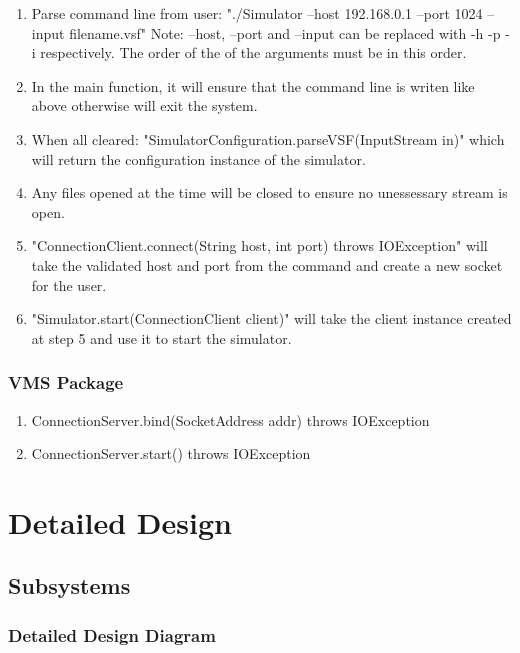 \documentclass{article}
\begin{document}
\begin{enumerate}
  \item Parse command line from user: 
		\newline "./Simulator --host 192.168.0.1 --port 1024 --input filename.vsf"
		\newline Note: --host, --port and --input can be replaced with -h -p -i respectively.
		\newline The order of the of the arguments must be in this order.
  \item In the main function, it will ensure that the command line is writen like above otherwise will exit the system.
  \item When all cleared: "SimulatorConfiguration.parseVSF(InputStream in)"
		\newline which will return the configuration instance of the simulator.
  \item Any files opened at the time will be closed to ensure no unessessary stream is open.
	\item "ConnectionClient.connect(String host, int port) throws IOException" will take the validated host and port from the command and create a new socket for the user.
	\item "Simulator.start(ConnectionClient client)" will take the client instance created at step 5 and use it to start the simulator.	
\end{enumerate}

\subsubsection{VMS Package}

\begin{enumerate}
  \item ConnectionServer.bind(SocketAddress addr) throws IOException
	\item ConnectionServer.start() throws IOException
\end{enumerate}


\section{Detailed Design}

\subsection{Subsystems}

\subsubsection{Detailed Design Diagram}
\end{document}
